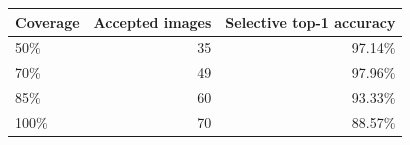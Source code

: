 \begin{tabular}{lrr}
\toprule
Coverage & Accepted images & Selective top-1 accuracy \\
\midrule
50\% & 35 & 97.14\% \\
70\% & 49 & 97.96\% \\
85\% & 60 & 93.33\% \\
100\% & 70 & 88.57\% \\
\bottomrule
\end{tabular}
